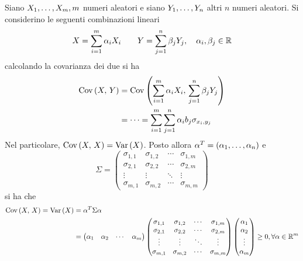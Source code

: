 \documentclass{subfiles}
\begin{document}
Siano \(\List{X}{1}{m}, m\) numeri aleatori e siano \(\List{Y}{1}{n}\) altri \(n\) numeri aleatori.
Si considerino le seguenti combinazioni lineari
\[
    X = \Sum{\alpha_{i} X_{i}}{i = 1}[m] \qquad Y = \Sum{\beta_{j} Y_{j}}{j = 1}[n], \quad \alpha_{i}, \beta_{j} \in \Real
\]
calcolando la covarianza dei due si ha
\[\begin{aligned}
        \Cov{X}{Y} & = \Cov{\Sum{\alpha_{i} X_{i}}{i = 1}[m]}{\Sum{\beta_{j} Y_{j}}{j = 1}[n]}        \\
                   & = \cdots = \Sum{\Sum{\alpha_{i}b_{j} \sigma_{x_{i}, y_{j}}}{j = 1}[n]}{i = 1}[m]
    \end{aligned}\]
Nel particolare, \(\Cov{X}{X} = \Var{X}\).
Posto allora \(\alpha^{T} = \Tuple{\alpha}{1}{n}\) e
\[
    \Sigma = \begin{pmatrix}
        \sigma_{1,1} & \sigma_{1,2}  & \cdots & \sigma_{1, m} \\
        \sigma_{2,1} & \sigma_{2,2}  & \cdots & \sigma_{2, m} \\
        \vdots       & \vdots        & \ddots & \vdots        \\
        \sigma_{m,1} & \sigma_{m, 2} & \cdots & \sigma_{m,m}
    \end{pmatrix}\]
si ha che
\[\begin{aligned}
        \Cov{X}{X} = \Var{X} & = \alpha^{T} \Sigma \alpha                                                      \\
                             & = \begin{pmatrix}
                                     \alpha_{1} & \alpha_{2} & \cdots & \alpha_{m}
                                 \end{pmatrix} \begin{pmatrix}
                                                   \sigma_{1,1} & \sigma_{1,2}  & \cdots & \sigma_{1, m} \\
                                                   \sigma_{2,1} & \sigma_{2,2}  & \cdots & \sigma_{2, m} \\
                                                   \vdots       & \vdots        & \ddots & \vdots        \\
                                                   \sigma_{m,1} & \sigma_{m, 2} & \cdots & \sigma_{m,m}
                                               \end{pmatrix} \begin{pmatrix}
                                                                 \alpha_{1} \\
                                                                 \alpha_{2} \\
                                                                 \vdots     \\
                                                                 \alpha_{m}
                                                             \end{pmatrix} \ge 0, \forall \alpha \in \Real^{m}
    \end{aligned}\]
\end{document}
